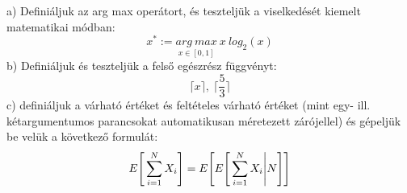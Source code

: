 \documentclass{article}
\begin{document}
a) Definiáljuk az arg max operátort, és teszteljük a viselkedését kiemelt matematikai módban:
\[x^* := \underset{x\in[0,1]}{arg\ max}\ x\ log_{2}(x)\]
b) Definiáljuk és teszteljük a felső egészrész függvényt:
\[\lceil{x}\rceil ,\ \bigg\lceil{\frac{5}{3}\bigg\rceil}\]
c) definiáljuk a várható értéket és feltételes várható értéket (mint egy- ill. kétargumentumos parancsokat automatikusan méretezett zárójellel) és gépeljük
be velük a következő formulát:
\[E\Bigg{[}\sum_{i=1}^{N}X_{i}\Bigg{]}=E\Bigg{[}E\Bigg{[}\sum_{i=1}^{N}X_{i}\Bigg{|}N\Bigg{]}\Bigg{]}\]
\end{document}

